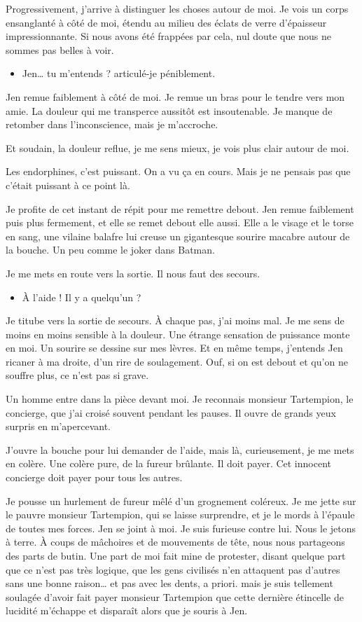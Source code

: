 Progressivement, j'arrive à distinguer les choses autour de moi. Je vois un corps ensanglanté à côté de moi, étendu au milieu des éclats de verre d'épaisseur impressionnante. Si nous avons été frappées par cela, nul doute que nous ne sommes pas belles à voir.

\begin{itemize}
\item Jen… tu m'entends ? articulé-je péniblement.
\end{itemize}

Jen remue faiblement à côté de moi. Je remue un bras pour le tendre vers mon amie. La douleur qui me transperce aussitôt est insoutenable. Je manque de retomber dans l'inconscience, mais je m'accroche.

Et soudain, la douleur reflue, je me sens mieux, je vois plus clair autour de moi.

Les endorphines, c'est puissant. On a vu ça en cours. Mais je ne pensais pas que c'était puissant à ce point là.

Je profite de cet instant de répit pour me remettre debout. Jen remue faiblement puis plus fermement, et elle se remet debout elle aussi. Elle a le visage et le torse en sang, une vilaine balafre lui creuse un gigantesque sourire macabre autour de la bouche. Un peu comme le joker dans Batman.

Je me mets en route vers la sortie. Il nous faut des secours.

\begin{itemize}
\item À l'aide ! Il y a quelqu'un ?
\end{itemize}

Je titube vers la sortie de secours. À chaque pas, j'ai moins mal. Je me sens de moins en moins sensible à la douleur. Une étrange sensation de puissance monte en moi. Un sourire se dessine sur mes lèvres. Et en même temps, j'entends Jen ricaner à ma droite, d'un rire de soulagement. Ouf, si on est debout et qu'on ne souffre plus, ce n'est pas si grave.

Un homme entre dans la pièce devant moi. Je reconnais monsieur Tartempion, le concierge, que j'ai croisé souvent pendant les pauses. Il ouvre de grands yeux surpris en m'apercevant.

J'ouvre la bouche pour lui demander de l'aide, mais là, curieusement, je me mets en colère. Une colère pure, de la fureur brûlante. Il doit payer. Cet innocent concierge doit payer pour tous les autres.

Je pousse un hurlement de fureur mêlé d'un grognement coléreux. Je me jette sur le pauvre monsieur Tartempion, qui se laisse surprendre, et je le mords à l'épaule de toutes mes forces. Jen se joint à moi. Je suis furieuse contre lui. Nous le jetons à terre. À coups de mâchoires et de mouvements de tête, nous nous partageons des parts de butin. Une part de moi fait mine de protester, disant quelque part que ce n'est pas très logique, que les gens civilisés n'en attaquent pas d'autres sans une bonne raison… et pas avec les dents, a priori. mais je suis tellement soulagée d'avoir fait payer monsieur Tartempion que cette dernière étincelle de lucidité m'échappe et disparaît alors que je souris à Jen.

